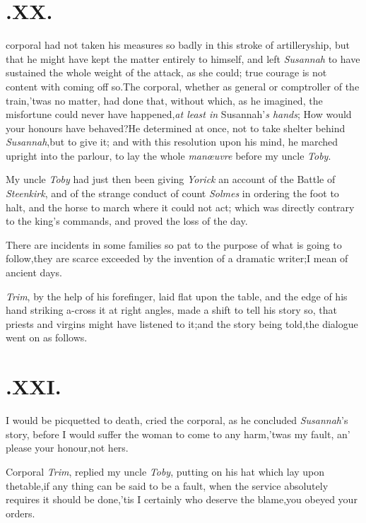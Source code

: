\documentclass{article}
\begin{document}
\section{.\enspace  XX.}

 corporal had not taken his
measures so badly in this stroke of\break
artilleryship, but that he might have kept the matter entirely to
himself, and left \textit{Susannah} to have sustained the whole weight
of the attack, as she could;\tsk\break
true courage is not content with coming off so.\tsh The corporal,
whether as general or comptroller of the train,\tsk ’twas no matter,\tsh
had done that, without which, as he imagined, the misfortune could never
have happened,\tsk \textit{at least in}
Susannah’\textit{s hands};\tsh
How would your honours have behaved?\tsh He determined at once, not to
take shelter behind \textit{Susannah},\tsk but to give it; and with this
resolution upon his mind, he marched upright into the parlour, to lay
the whole \textit{manœuvre} before my uncle \textit{Toby}.

My uncle \textit{Toby} had just then been\break
giving \textit{Yorick} an account of the Battle of \textit{Steenkirk},
and of the strange conduct of count \textit{Solmes} in ordering the foot
to halt, and the horse to march where it could not act; which was
directly contrary to the king’s commands, and proved the loss of the
day.

There are incidents in some families so pat to the purpose of
what is going to follow,\tsk they are scarce exceeded by the
invention of a dramatic writer;\tsk I mean of ancient
days.\tsh{}

\textit{Trim}, by the help of his forefinger, laid flat upon the
table, and the edge of his hand striking a-cross it at right angles,
made a shift to tell his story so, that priests and virgins might
have listened to it;\tsk and the story being told,\break\tsk the
dialogue went on as follows.

\section{.\enspace  XXI.}

\quad\tsh  I would be picquetted to death, cried
the corporal, as he concluded \textit{Susannah}’s story, before
I would suffer the woman to come to any harm,\tsk ’twas my
fault, an’ please your honour,\tsk not hers.

Corporal \textit{Trim}, replied my uncle \textit{Toby}, putting on
his hat which lay upon the\break table,\tsh if any thing can be said to be a
fault, when the service absolutely requires it should be
done,\tsk ’tis I certainly who deserve the blame,\tsk you
obeyed your orders.
\end{document}
